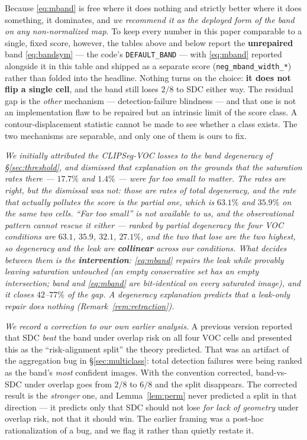 \documentclass[11pt]{article}
\theoremstyle{remark}
\begin{document}
Because \eqref{eq:mband} is free where it does nothing and strictly better where it
does something, it dominates, and \emph{we recommend it as the deployed form of the
band on any non-normalized map}. To keep every number in this paper comparable to a
single, fixed score, however, the tables above and below report the
\textbf{unrepaired} band \eqref{eq:bandsym} --- the code's \texttt{DEFAULT\_BAND} ---
with \eqref{eq:mband} reported alongside it in this table and shipped as a separate
score (\texttt{neg\_mband\_width\_*}) rather than folded into the headline. Nothing
turns on the choice: \textbf{it does not flip a single cell}, and the band still loses
$2/8$ to SDC either way. The residual gap is the \emph{other}
mechanism --- detection-failure blindness --- and that one is not an implementation
flaw to be repaired but an intrinsic limit of the score class. A
contour-displacement statistic cannot be made to see whether a class exists. The two
mechanisms are separable, and only one of them is ours to fix.

\emph{We initially attributed the CLIPSeg-VOC losses to the band degeneracy of
\S\ref{sec:threshold}, and dismissed that explanation on the grounds that the
saturation rates there --- $17.7\%$ and $1.4\%$ --- were far too small to matter.
The rates are right, but the dismissal was not: those are rates of \emph{total}
degeneracy, and the rate that actually pollutes the score is the partial one, which
is $63.1\%$ and $35.9\%$ on the same two cells. ``Far too small'' is not available
to us, and the observational pattern cannot rescue it either --- ranked by partial
degeneracy the four VOC conditions are $63.1$, $35.9$, $32.1$, $27.1\%$, and the two
that lose are the two highest, so degeneracy and the leak are \textbf{collinear}
across our conditions. What decides between them is the \textbf{intervention}:
\eqref{eq:mband} repairs the leak while provably leaving saturation untouched (an
empty conservative set has an empty intersection; band and \eqref{eq:mband} are
bit-identical on every saturated image), and it closes $42$--$77\%$ of the gap. A
degeneracy explanation predicts that a leak-only repair does nothing
(Remark~\ref{rem:retraction}).}

\emph{We record a correction to our own earlier analysis.} A previous version
reported that SDC \emph{beat} the band under overlap risk on all four VOC cells and
presented this as the ``risk-alignment split'' the theory predicted. That was an
artifact of the aggregation bug in \S\ref{sec:multiclass}: total detection failures
were being ranked as the band's \emph{most} confident images. With the convention
corrected, band-vs-SDC under overlap goes from $2/8$ to $6/8$ and the split
disappears. The corrected result is the \emph{stronger} one, and Lemma~\ref{lem:perm}
never predicted a split in that direction --- it predicts only that SDC should not
lose \emph{for lack of geometry} under overlap risk, not that it should win. The
earlier framing was a post-hoc rationalization of a bug, and we flag it rather than
quietly restate it.
\end{document}

